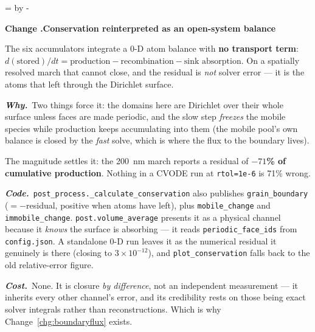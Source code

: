 \documentclass[11pt,a4paper]{article}
\newcommand{\code}[1]{\texttt{\small #1}}
\newcommand{\needlines}[1]{%
  \par\dimen0=\pagegoal \advance\dimen0 by -\pagetotal
  \ifdim\dimen0<#1\baselineskip \newpage \fi}
\newcounter{chg}
\newcommand{\change}[1]{%
  \needlines{4}%
  \refstepcounter{chg}%
  \par\medskip\noindent
  {\bfseries\boldmath Change \thechg.\quad #1}%
  \par\nobreak\smallskip}
\newcommand{\why}[1]{\par\noindent\textbf{\itshape Why.}\ #1\par}
\newcommand{\impact}[1]{\par\noindent\textbf{\itshape Code.}\ #1\par}
\newcommand{\cost}[1]{\par\noindent\textbf{\itshape Cost.}\ #1\par}
\begin{document}
\change{Conservation reinterpreted as an open-system balance}
\label{chg:conservation}
The six accumulators integrate a 0-D atom balance with \textbf{no transport
term}:
$d(\text{stored})/dt = \text{production} - \text{recombination} -
\text{sink absorption}$.
On a spatially resolved march that cannot close, and the residual is
\emph{not} solver error --- it is the atoms that left through the Dirichlet
surface.
\why{Two things force it: the domains here are Dirichlet over their whole
surface unless faces are made periodic, and the slow step \emph{freezes} the
mobile species while production keeps accumulating into them (the mobile pool's
own balance is closed by the \emph{fast} solve, which is where the flux to the
boundary lives).

The magnitude settles it: the 200~nm march reports a residual of \textbf{$-71$\%
of cumulative production}. Nothing in a CVODE run at \code{rtol=1e-6} is 71\%
wrong.}
\impact{\code{post\_process.\_calculate\_conservation} also publishes
\code{grain\_boundary} ($= -$residual, positive when atoms have left), plus
\code{mobile\_change} and \code{immobile\_change}.
\code{post.volume\_average} presents it as a physical channel because it
\emph{knows} the surface is absorbing --- it reads \code{periodic\_face\_ids}
from \code{config.json}. A standalone 0-D run leaves it as the numerical
residual it genuinely is there (closing to $3\times10^{-12}$), and
\code{plot\_conservation} falls back to the old relative-error figure.}
\cost{None. It is closure \emph{by difference}, not an independent
measurement --- it inherits every other channel's error, and its credibility
rests on those being exact solver integrals rather than reconstructions.
Which is why Change~\ref{chg:boundaryflux} exists.}
\end{document}
